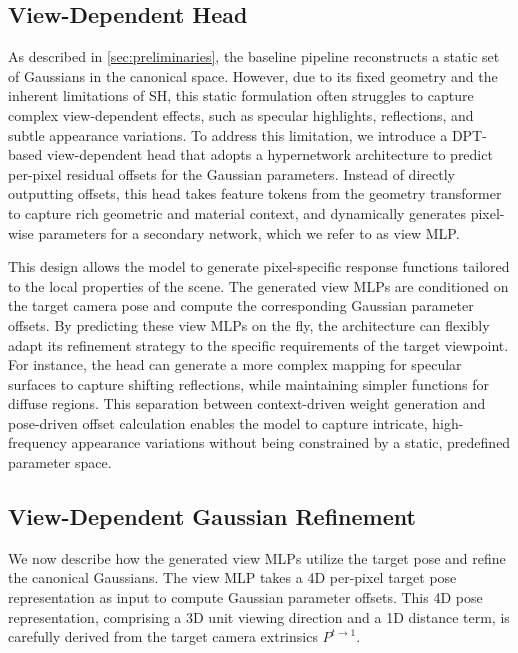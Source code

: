 \documentclass[runningheads]{llncs}
\begin{document}
\subsection{View-Dependent Head}
\label{sec:vdhead}
As described in \cref{sec:preliminaries}, the baseline pipeline reconstructs a static set of Gaussians in the canonical space. However, due to its fixed geometry and the inherent limitations of SH, this static formulation often struggles to capture complex view-dependent effects, such as specular highlights, reflections, and subtle appearance variations. To address this limitation, we introduce a DPT-based view-dependent head that adopts a hypernetwork architecture \cite{ha2017hypernetworks} to predict per-pixel residual offsets for the Gaussian parameters. Instead of directly outputting offsets, this head takes feature tokens from the geometry transformer to capture rich geometric and material context, and dynamically generates pixel-wise parameters for a secondary network, which we refer to as view MLP. 

This design allows the model to generate pixel-specific response functions tailored to the local properties of the scene. The generated view MLPs are conditioned on the target camera pose and compute the corresponding Gaussian parameter offsets. By predicting these view MLPs on the fly, the architecture can flexibly adapt its refinement strategy to the specific requirements of the target viewpoint. For instance, the head can generate a more complex mapping for specular surfaces to capture shifting reflections, while maintaining simpler functions for diffuse regions. This separation between context-driven weight generation and pose-driven offset calculation enables the model to capture intricate, high-frequency appearance variations without being constrained by a static, predefined parameter space.

\subsection{View-Dependent Gaussian Refinement}
\label{sec:vdrefine}
We now describe how the generated view MLPs utilize the target pose and refine the canonical Gaussians. The view MLP takes a 4D per-pixel target pose representation as input to compute Gaussian parameter offsets. This 4D pose representation, comprising a 3D unit viewing direction and a 1D distance term, is carefully derived from the target camera extrinsics $P^{t \to 1}$.
\end{document}
